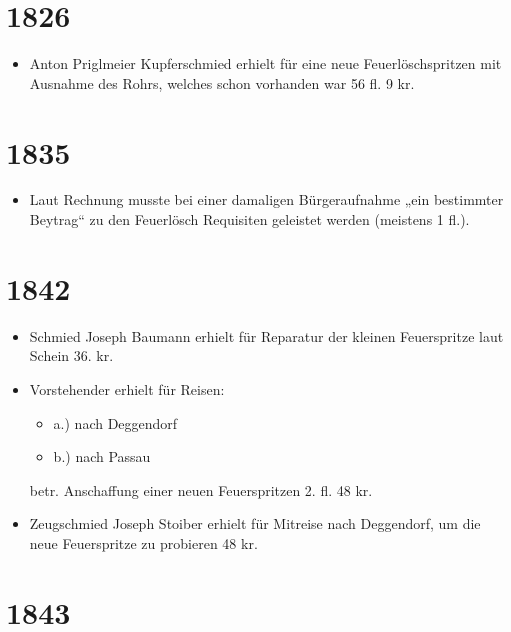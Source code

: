 \documentclass[12pt,a4paper]{book}
\begin{document}
\section*{1826}

\begin{itemize}
\item Anton Priglmeier Kupferschmied erhielt für eine neue Feuerlöschspritzen
mit Ausnahme des Rohrs, welches schon vorhanden war 56 fl. 9 kr.
\end{itemize}

\section*{1835}

\begin{itemize}
\item Laut Rechnung musste bei einer damaligen Bürgeraufnahme „ein bestimmter
Beytrag“ zu den Feuerlösch Requisiten geleistet werden (meistens 1 fl.).
\end{itemize}

\section*{1842}

\begin{itemize}
\item Schmied Joseph Baumann erhielt für Reparatur der kleinen Feuerspritze laut
Schein 36. kr.

\item Vorstehender erhielt für Reisen:

\begin{itemize}
\item a.) nach Deggendorf
\item b.) nach Passau
\end{itemize}

betr. Anschaffung einer neuen Feuerspritzen 2. fl. 48 kr.

\item  Zeugschmied Joseph Stoiber erhielt für Mitreise nach Deggendorf, um die
neue Feuerspritze zu probieren 48 kr.
\end{itemize}

\section*{1843}
\end{document}
